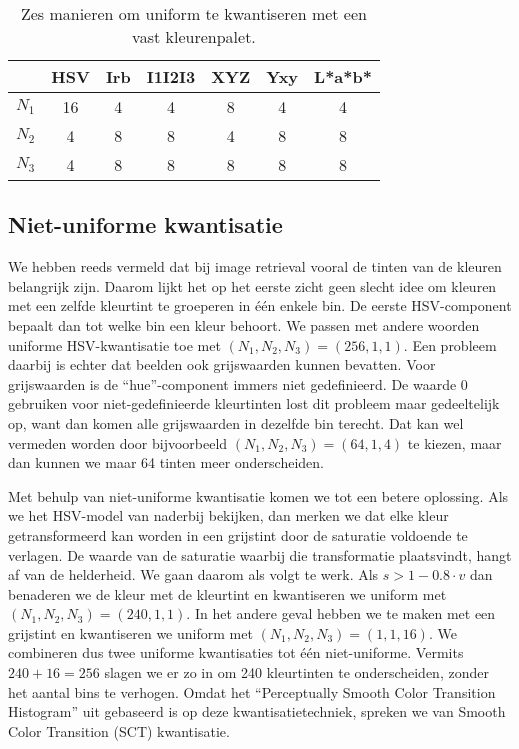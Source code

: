 \begin{table}[tbp]
\begin{center}
\begin{tabular}{|c|cccccc|}
\hline
 		& HSV & Irb & I1I2I3 & XYZ & Yxy & L*a*b* \\
\hline
$N_1$ 	& 16 & 4 & 4 & 8 & 4 & 4 \\
$N_2$	& 4  & 8 & 8 & 4 & 8 & 8 \\
$N_3$	& 4  & 8 & 8 & 8 & 8 & 8 \\
\hline
\end{tabular}
\caption{\label{tab:uniforme_kwantisatie}Zes manieren om uniform te kwantiseren met een vast kleurenpalet.}
\end{center}
\end{table}


\subsection{Niet-uniforme kwantisatie}

We hebben reeds vermeld dat bij image retrieval vooral de tinten van de kleuren belangrijk zijn. Daarom 
lijkt het op het eerste zicht geen slecht idee om kleuren met een zelfde kleurtint te groeperen in 
\'e\'en enkele bin. De eerste HSV-component bepaalt dan tot welke bin een kleur behoort. We passen
met andere woorden uniforme HSV-kwantisatie toe met $(N_1,N_2,N_3)=(256,1,1)$. Een probleem daarbij 
is echter dat beelden ook grijswaarden kunnen bevatten. Voor grijswaarden is de ``hue''-component immers 
niet gedefinieerd. De waarde 0 gebruiken voor niet-gedefinieerde kleurtinten lost dit probleem maar 
gedeeltelijk op, want dan komen alle grijswaarden in dezelfde bin terecht. Dat kan wel vermeden worden 
door bijvoorbeeld $(N_1,N_2,N_3)=(64,1,4)$ te kiezen, maar dan kunnen we maar 64 tinten meer onderscheiden.

Met behulp van niet-uniforme kwantisatie komen we tot een betere oplossing. Als we het HSV-model van naderbij
bekijken, dan merken we dat elke kleur getransformeerd kan worden in een grijstint door de saturatie
voldoende te verlagen. De waarde van de saturatie waarbij die transformatie plaatsvindt, hangt af
van de helderheid. We gaan daarom als volgt te werk. Als $s > 1 - 0.8 \cdot v$ dan benaderen we de kleur
met de kleurtint en kwantiseren we uniform met $(N_1,N_2,N_3)=(240,1,1)$. In het andere geval hebben we
te maken met een grijstint en kwantiseren we uniform met $(N_1,N_2,N_3)=(1,1,16)$. We combineren dus
twee uniforme kwantisaties tot \'e\'en niet-uniforme. Vermits $240 + 16 = 256$
slagen we er zo in om 240 kleurtinten te onderscheiden, zonder het aantal bins te verhogen. Omdat het
``Perceptually Smooth Color Transition Histogram'' uit \cite{sural:perceptually_smooth_histogram} 
gebaseerd is op deze kwantisatietechniek, spreken we van Smooth Color Transition (SCT) kwantisatie.  

